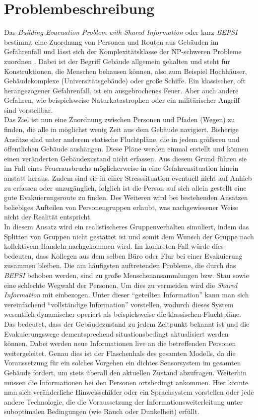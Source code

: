\documentclass[a4paper, 11pt]{scrreprt}
\begin{document}
\chapter{Problembeschreibung}
Das \textit{Building Evacuation Problem with Shared Information} oder kurz \textit{BEPSI}
bestimmt eine Zuordnung von Personen und Routen aus Gebäuden im Gefahrenfall und lässt sich
der Komplexitätsklasse der NP-schweren Probleme zuordnen \cite{bepsi}.
Dabei ist der Begriff Gebäude allgemein gehalten und steht für Konstruktionen, die
Menschen behausen können, also zum Beispiel Hochhäuser, Gebäudekomplexe (Universitätsgebäude)
oder große Schiffe. Ein klassischer, oft herangezogener Gefahrenfall, ist ein
ausgebrochenes Feuer. Aber auch andere Gefahren, wie beispielsweise Naturkatastrophen oder
ein militärischer Angriff sind vorstellbar.\\
Das Ziel ist nun eine Zuordnung zwischen Personen und Pfaden (Wegen) zu finden,
die alle in möglichst wenig Zeit aus dem
Gebäude navigiert. Bisherige Ansätze sind unter anderem statische Fluchtpläne, die in jedem
größeren und öffentlichen Gebäude aushängen. Diese Pläne werden einmal erstellt und können
einen veränderten Gebäudezustand nicht erfassen. Aus diesem Grund führen sie im Fall eines
Feuerausbruchs möglicherweise in eine Gefahrensituation hinein anstatt heraus. Zudem
sind sie in einer Stresssituation eventuell nicht auf Anhieb zu erfassen oder unzugänglich,
folglich ist die Person
auf sich allein gestellt eine gute Evakuierungsroute zu finden. Des Weiteren wird bei
bestehenden Ansätzen beliebiges Aufteilen von Personengruppen erlaubt, was nachgewiesener Weise
nicht der Realität entspricht.\\
In diesem Ansatz wird ein realistischeres Gruppenverhalten simuliert, indem das Splitten von
Gruppen nicht gestattet ist und somit dem Wunsch der Gruppe nach kollektivem Handeln nachgekommen wird.
Im konkreten Fall würde dies bedeuten, dass Kollegen aus dem selben Büro oder Flur bei einer Evakuierung
zusammen bleiben. Die am häufigsten auftretenden Probleme, die durch das \textit{BEPSI} behoben
werden, sind zu große Menschenansammlungen bzw. Stau sowie eine schlechte Wegwahl der Personen.
Um dies zu vermeiden wird die \textit{Shared Information} mit einbezogen. Unter dieser
``geteilten Information'' kann man sich vereinfachend ``vollständige Information'' vorstellen,
wodurch dieses System wesentlich dynamischer operiert als beispielsweise die klassischen Fluchtpläne.
Das bedeutet, dass der Gebäudezustand zu jedem Zeitpunkt bekannt ist und die Evakuierungswege
dementsprechend situationsbedingt aktualisiert werden können. Dabei werden neue Informationen live
an die betreffenden Personen weitergeleitet. Genau dies ist der Flaschenhals des gesamten Modells,
da die Voraussetzung für ein solches Vorgehen ein dichtes Sensorsystem im gesamten Gebäude fordert,
um stets überall den aktuellen Zustand abzufragen. Weiterhin müssen die Informationen bei den
Personen ortsbedingt ankommen. Hier könnte man sich veränderliche Hinweisschilder oder ein
Sprachsystem vorstellen oder jede andere Technologie, die die Voraussetzung der
Informationsweiterleitung unter suboptimalen Bedingungen (wie Rauch oder Dunkelheit) erfüllt.
\end{document}
